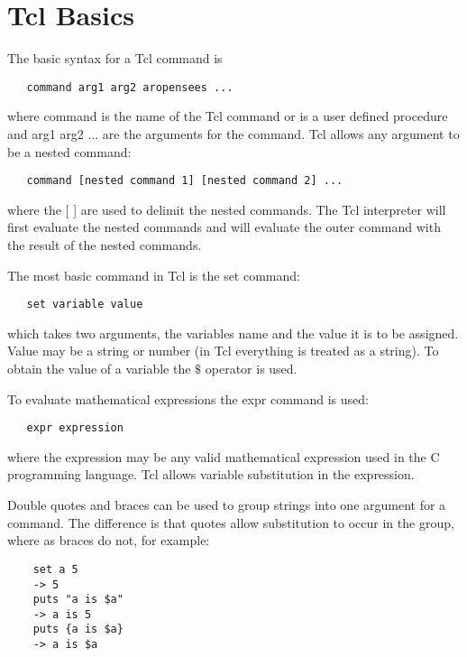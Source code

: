 \documentclass[12pt]{article}
\begin{document}
\section {Tcl Basics}
The basic syntax for a Tcl command is

{\sf\small
\begin{verbatim}
   command arg1 arg2 aropensees ...
\end{verbatim}
}

\noindent where command is the name of the Tcl command or is a user defined
procedure and arg1 arg2 ... are the arguments for the command. Tcl allows
any argument to be a nested command:

{\sf\small
\begin{verbatim}
   command [nested command 1] [nested command 2] ...
\end{verbatim}
}

\noindent where the [ ] are used to delimit the nested commands. The Tcl
interpreter will first evaluate the nested commands and will evaluate
the outer command with the result of the nested commands.

The most basic command in Tcl is the set command:

{\sf\small
\begin{verbatim}
   set variable value
\end{verbatim}
}

\noindent which takes two arguments, the variables name and the value it is to
be assigned. Value may be a string or number (in Tcl everything is
treated as a string). To obtain the value of a variable the $\$$
operator is used. 

To evaluate mathematical expressions the expr command is used:

{\sf\small
\begin{verbatim}
   expr expression
\end{verbatim}
}

\noindent where the expression may be any valid mathematical
expression used in the C programming language. Tcl allows variable
substitution in the expression.

Double quotes and braces can be used to group strings into one
argument for a command. The difference is that quotes allow
substitution to occur in the group, where as braces do not, for example:

{\sf\small
\begin{verbatim}
	set a 5
	-> 5
	puts "a is $a"
	-> a is 5
	puts {a is $a}
	-> a is $a
\end{verbatim}
}
\end{document}
